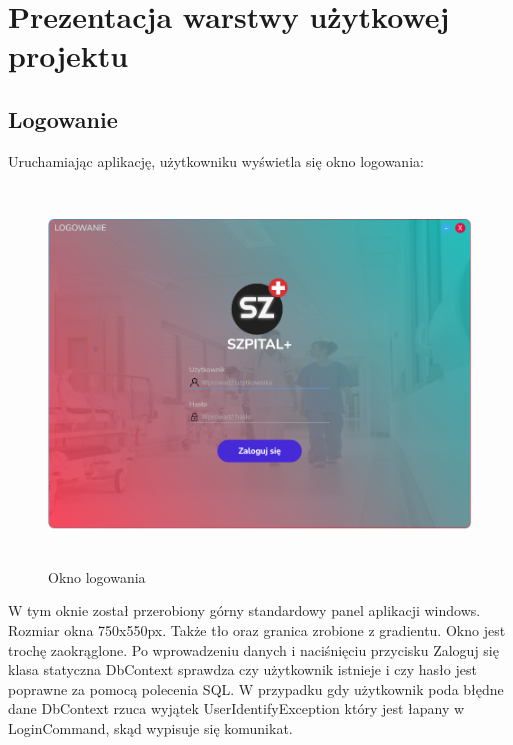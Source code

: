 ﻿%
\chapter{Prezentacja warstwy użytkowej projektu}

\section{Logowanie}

Uruchamiając aplikację, użytkowniku wyświetla się okno logowania:

\begin{figure}[H]
\begin{center}
    \includegraphics[height=10cm]{images/log_widok.png}
    \caption{Okno logowania}
\end{center}
\end{figure}

W tym oknie został przerobiony górny standardowy panel aplikacji windows. Rozmiar okna 750x550px. Także tło oraz granica zrobione z gradientu. Okno jest trochę zaokrąglone. Po wprowadzeniu danych i naciśnięciu przycisku \textquotedbl Zaloguj się\textquotedbl{} klasa statyczna DbContext sprawdza czy użytkownik istnieje i czy hasło jest poprawne za pomocą polecenia SQL. W przypadku gdy użytkownik poda błędne dane DbContext rzuca wyjątek \textquotedbl UserIdentifyException\textquotedbl{} który jest łapany w LoginCommand, skąd wypisuje się komunikat.

